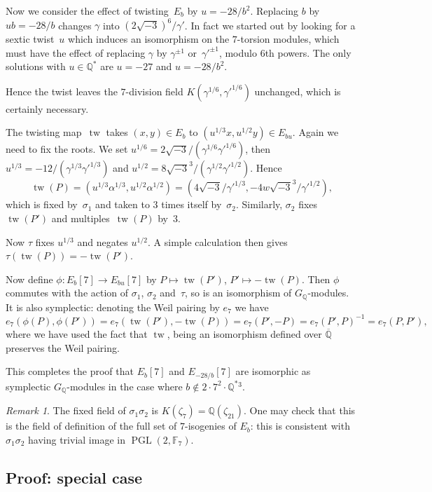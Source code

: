 \documentclass[12pt]{amsart}
\newcommand{\F}{\mathbb{F}}
\newcommand{\Q}{\mathbb{Q}}
\DeclareMathOperator{\tw}{tw}
\newcommand{\PGL}{\operatorname{PGL}}
\def\r3{\sqrt{-3}}
\numberwithin{equation}{section}
\theoremstyle{definition}
\theoremstyle{remark}
\newtheorem{remark}[theorem]{Remark}
\begin{document}
Now we consider the effect of twisting~$E_b$ by $u=-28/b^2$.
Replacing $b$ by $ub=-28/b$ changes $\gamma$ into $(2\r3)^6/\gamma'$.
In fact we started out by looking for a sextic twist~$u$ which induces
an isomorphism on the $7$-torsion modules, which must have the effect
of replacing $\gamma$ by $\gamma^{\pm1}$ or~$\gamma'^{\pm1}$, modulo
$6$th powers.  The only solutions with $u\in\Q^*$ are $u=-27$ and
$u=-28/b^2$.

Hence the twist leaves the $7$-division field
$K(\gamma^{1/6},\gamma'^{1/6})$ unchanged, which is certainly
necessary.

The twisting map~$\tw$ takes $(x,y)\in E_b$ to $(u^{1/3}x,u^{1/2}y)\in
E_{bu}$.  Again we need to fix the roots.  We set
$u^{1/6}=2\r3/(\gamma^{1/6}\gamma'^{1/6})$, then
$u^{1/3}=-12/(\gamma^{1/3}\gamma'^{1/3})$ and
$u^{1/2}=8\r3^3/(\gamma^{1/2}\gamma'^{1/2})$.  Hence
\[
 \tw(P) = (u^{1/3}\alpha^{1/3},u^{1/2}\alpha^{1/2}) =
(4\r3/\gamma'^{1/3},-4w\r3^3/\gamma'^{1/2}),
\]
which is fixed by~$\sigma_1$ and taken to $3$ times itself
by~$\sigma_2$.  Similarly, $\sigma_2$ fixes $\tw(P')$ and
multiples~$\tw(P)$ by~$3$.

Now $\tau$ fixes $u^{1/3}$ and negates $u^{1/2}$. A simple calculation
then gives $\tau(\tw(P)) = -\tw(P')$.

Now define $\phi: E_b[7] \to E_{bu}[7]$ by $P\mapsto\tw(P')$,
$P'\mapsto-\tw(P)$.  Then $\phi$ commutes with the action of
$\sigma_1$, $\sigma_2$ and~$\tau$, so is an isomorphism of
$G_\Q$-modules.  It is also symplectic:  denoting the Weil pairing by
$e_7$ we have
\[
e_7(\phi(P),\phi(P')) = e_7(\tw(P'),-\tw(P)) = e_7(P',-P) =
e_7(P',P)^{-1} = e_7(P,P'),
\]
where we have used the fact that $\tw$, being an isomorphism defined
over $\overline{\Q}$ preserves the Weil pairing.

This completes the proof that $E_b[7]$ and $E_{-28/b}[7]$ are
isomorphic as symplectic $G_{\Q}$-modules in the case where $b\notin
2\cdot7^2\cdot \Q^*{}^3$.


\begin{remark}
The fixed field of $\sigma_1\sigma_2$ is $K(\zeta_7)=\Q(\zeta_{21})$.
One may check that this is the field of definition of the full set of
$7$-isogenies of $E_b$: this is consistent with $\sigma_1\sigma_2$
having trivial image in $\PGL(2,\F_7)$.
\end{remark}

\subsection{Proof: special case}
\end{document}
